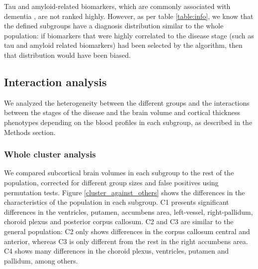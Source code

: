 Tau and amyloid-related biomarkers, which are commonly associated with dementia \cite{Dage2016,Ovod2017,Nakamura2018}, are not ranked highly. However, as per table \ref{table:info}, we know that the defined subgroups have a diagnosis distribution similar to the whole population: if biomarkers that were highly correlated to the disease stage (such as tau and amyloid related biomarkers) had been selected by the algorithm, then that distribution would have been biased. \\

\subsection{Interaction analysis}

We analyzed the heterogeneity between the different groups and the interactions between the stages of the disease and the brain volume and cortical thickness phenotypes depending on the blood profiles in each subgroup, as described in the Methods section. \\

\subsubsection{Whole cluster analysis}

We compared subcortical brain volumes in each subgroup to the rest of the population, corrected for different group sizes and false positives using permutation tests. Figure \ref{cluster_against_others} shows the differences in the characteristics of the population in each subgroup. C1 presents significant differences in the ventricles, putamen, accumbens area, left-vessel, right-pallidum, choroid plexus and posterior corpus callosum. C2 and C3 are similar to the general population: C2 only shows differences in the corpus callosum central and anterior, whereas C3 is only different from the rest in the right accumbens area. C4 shows many differences in the choroid plexus, ventricles, putamen and pallidum, among others.

